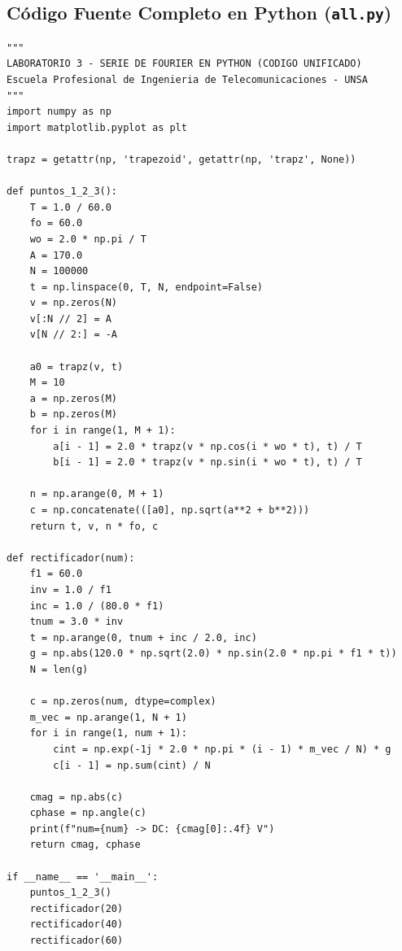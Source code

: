 \documentclass[11pt,a4paper]{article}
\begin{document}
\subsection{Código Fuente Completo en Python (\texttt{all.py})}
\begin{lstlisting}[style=pythonStyle,caption={Código unificado completo en Python: all.py}]
"""
LABORATORIO 3 - SERIE DE FOURIER EN PYTHON (CODIGO UNIFICADO)
Escuela Profesional de Ingenieria de Telecomunicaciones - UNSA
"""
import numpy as np
import matplotlib.pyplot as plt

trapz = getattr(np, 'trapezoid', getattr(np, 'trapz', None))

def puntos_1_2_3():
    T = 1.0 / 60.0
    fo = 60.0
    wo = 2.0 * np.pi / T
    A = 170.0
    N = 100000
    t = np.linspace(0, T, N, endpoint=False)
    v = np.zeros(N)
    v[:N // 2] = A
    v[N // 2:] = -A

    a0 = trapz(v, t)
    M = 10
    a = np.zeros(M)
    b = np.zeros(M)
    for i in range(1, M + 1):
        a[i - 1] = 2.0 * trapz(v * np.cos(i * wo * t), t) / T
        b[i - 1] = 2.0 * trapz(v * np.sin(i * wo * t), t) / T

    n = np.arange(0, M + 1)
    c = np.concatenate(([a0], np.sqrt(a**2 + b**2)))
    return t, v, n * fo, c

def rectificador(num):
    f1 = 60.0
    inv = 1.0 / f1
    inc = 1.0 / (80.0 * f1)
    tnum = 3.0 * inv
    t = np.arange(0, tnum + inc / 2.0, inc)
    g = np.abs(120.0 * np.sqrt(2.0) * np.sin(2.0 * np.pi * f1 * t))
    N = len(g)

    c = np.zeros(num, dtype=complex)
    m_vec = np.arange(1, N + 1)
    for i in range(1, num + 1):
        cint = np.exp(-1j * 2.0 * np.pi * (i - 1) * m_vec / N) * g
        c[i - 1] = np.sum(cint) / N

    cmag = np.abs(c)
    cphase = np.angle(c)
    print(f"num={num} -> DC: {cmag[0]:.4f} V")
    return cmag, cphase

if __name__ == '__main__':
    puntos_1_2_3()
    rectificador(20)
    rectificador(40)
    rectificador(60)
\end{lstlisting}
\end{document}
